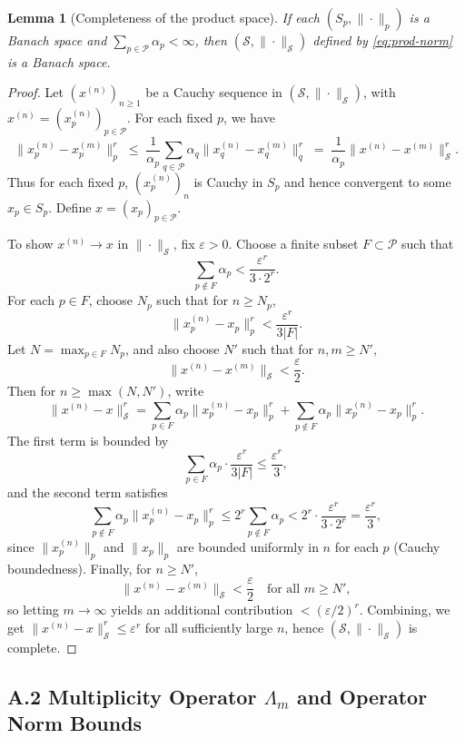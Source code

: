 \documentclass[11pt]{article}
\newtheorem{lemma}[theorem]{Lemma}
\begin{document}
\begin{lemma}[Completeness of the product space]\label{lem:prod-banach}
If each $(S_p,\|\cdot\|_p)$ is a Banach space and $\sum_{p \in \mathcal{P}} \alpha_p < \infty$, then $(\mathcal{S},\|\cdot\|_{\mathcal{S}})$ defined by \eqref{eq:prod-norm} is a Banach space.
\end{lemma}

\begin{proof}
Let $(x^{(n)})_{n \ge 1}$ be a Cauchy sequence in $(\mathcal{S},\|\cdot\|_{\mathcal{S}})$, with $x^{(n)} = (x^{(n)}_p)_{p \in \mathcal{P}}$. For each fixed $p$, we have
\[
  \|x^{(n)}_p - x^{(m)}_p\|_p^r
  \;\le\;
  \frac{1}{\alpha_p}
  \sum_{q \in \mathcal{P}} \alpha_q \|x^{(n)}_q - x^{(m)}_q\|_q^r
  \;=\;
  \frac{1}{\alpha_p} \|x^{(n)} - x^{(m)}\|_{\mathcal{S}}^r.
\]
Thus for each fixed $p$, $(x^{(n)}_p)_n$ is Cauchy in $S_p$ and hence convergent to some $x_p \in S_p$. Define $x = (x_p)_{p \in \mathcal{P}}$.

To show $x^{(n)} \to x$ in $\|\cdot\|_{\mathcal{S}}$, fix $\varepsilon > 0$. Choose a finite subset $F \subset \mathcal{P}$ such that
\[
  \sum_{p \notin F} \alpha_p < \frac{\varepsilon^r}{3 \cdot 2^r}.
\]
For each $p \in F$, choose $N_p$ such that for $n \ge N_p$,
\[
  \|x^{(n)}_p - x_p\|_p^r < \frac{\varepsilon^r}{3 |F|}.
\]
Let $N = \max_{p \in F} N_p$, and also choose $N'$ such that for $n,m \ge N'$,
\[
  \|x^{(n)} - x^{(m)}\|_{\mathcal{S}} < \frac{\varepsilon}{2}.
\]
Then for $n \ge \max(N,N')$, write
\[
  \|x^{(n)} - x\|_{\mathcal{S}}^r
  =
  \sum_{p \in F} \alpha_p \|x^{(n)}_p - x_p\|_p^r
  +
  \sum_{p \notin F} \alpha_p \|x^{(n)}_p - x_p\|_p^r.
\]
The first term is bounded by
\[
  \sum_{p \in F} \alpha_p \cdot \frac{\varepsilon^r}{3|F|}
  \le \frac{\varepsilon^r}{3},
\]
and the second term satisfies
\[
  \sum_{p \notin F} \alpha_p \|x^{(n)}_p - x_p\|_p^r
  \le
  2^r \sum_{p \notin F} \alpha_p
  < 2^r \cdot \frac{\varepsilon^r}{3 \cdot 2^r}
  = \frac{\varepsilon^r}{3},
\]
since $\|x^{(n)}_p\|_p$ and $\|x_p\|_p$ are bounded uniformly in $n$ for each $p$ (Cauchy boundedness). Finally, for $n \ge N'$,
\[
  \|x^{(n)} - x^{(m)}\|_{\mathcal{S}} < \frac{\varepsilon}{2}
  \quad \text{for all } m \ge N',
\]
so letting $m \to \infty$ yields an additional contribution $< (\varepsilon/2)^r$. Combining, we get $\|x^{(n)} - x\|_{\mathcal{S}}^r \le \varepsilon^r$ for all sufficiently large $n$, hence $(\mathcal{S},\|\cdot\|_{\mathcal{S}})$ is complete.
\end{proof}

\subsection{A.2 Multiplicity Operator $\Lambda_m$ and Operator Norm Bounds}
\end{document}
